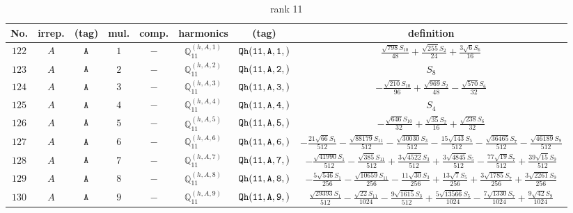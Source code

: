 \documentclass[fleqn,8pt]{jsarticle}
\begin{document}
\begin{table}[ht!]
\begin{center}
\caption{rank 11}
\renewcommand{\arraystretch}{1.3}
\begin{tabular}{cccccccc} \hline \hline
No. & irrep. & (tag) & mul. & comp. & harmonics & (tag) & definition \\ \hline
$ 122 $ & $ A $ & $ {\tt A} $ & $ 1 $ & $ - $ & $ \mathbb{Q}_{11}^{(h,A,1)} $ & $ {\tt Qh(11,A,1,)} $ & $ \frac{\sqrt{798} S_{10}}{48} + \frac{\sqrt{255} S_{2}}{24} + \frac{3 \sqrt{6} S_{6}}{16} $ \\
$ 123 $ & $ A $ & $ {\tt A} $ & $ 2 $ & $ - $ & $ \mathbb{Q}_{11}^{(h,A,2)} $ & $ {\tt Qh(11,A,2,)} $ & $ S_{8} $ \\
$ 124 $ & $ A $ & $ {\tt A} $ & $ 3 $ & $ - $ & $ \mathbb{Q}_{11}^{(h,A,3)} $ & $ {\tt Qh(11,A,3,)} $ & $ - \frac{\sqrt{210} S_{10}}{96} + \frac{\sqrt{969} S_{2}}{48} - \frac{\sqrt{570} S_{6}}{32} $ \\
$ 125 $ & $ A $ & $ {\tt A} $ & $ 4 $ & $ - $ & $ \mathbb{Q}_{11}^{(h,A,4)} $ & $ {\tt Qh(11,A,4,)} $ & $ S_{4} $ \\
$ 126 $ & $ A $ & $ {\tt A} $ & $ 5 $ & $ - $ & $ \mathbb{Q}_{11}^{(h,A,5)} $ & $ {\tt Qh(11,A,5,)} $ & $ - \frac{\sqrt{646} S_{10}}{32} + \frac{\sqrt{35} S_{2}}{16} + \frac{\sqrt{238} S_{6}}{32} $ \\
$ 127 $ & $ A $ & $ {\tt A} $ & $ 6 $ & $ - $ & $ \mathbb{Q}_{11}^{(h,A,6)} $ & $ {\tt Qh(11,A,6,)} $ & $ - \frac{21 \sqrt{66} S_{1}}{512} - \frac{\sqrt{88179} S_{11}}{512} - \frac{\sqrt{30030} S_{3}}{512} - \frac{15 \sqrt{143} S_{5}}{512} - \frac{\sqrt{36465} S_{7}}{512} - \frac{\sqrt{46189} S_{9}}{512} $ \\
$ 128 $ & $ A $ & $ {\tt A} $ & $ 7 $ & $ - $ & $ \mathbb{Q}_{11}^{(h,A,7)} $ & $ {\tt Qh(11,A,7,)} $ & $ - \frac{\sqrt{41990} S_{1}}{512} - \frac{\sqrt{385} S_{11}}{512} + \frac{3 \sqrt{4522} S_{3}}{512} + \frac{3 \sqrt{4845} S_{5}}{512} - \frac{77 \sqrt{19} S_{7}}{512} + \frac{39 \sqrt{15} S_{9}}{512} $ \\
$ 129 $ & $ A $ & $ {\tt A} $ & $ 8 $ & $ - $ & $ \mathbb{Q}_{11}^{(h,A,8)} $ & $ {\tt Qh(11,A,8,)} $ & $ - \frac{5 \sqrt{546} S_{1}}{256} - \frac{\sqrt{10659} S_{11}}{256} - \frac{11 \sqrt{30} S_{3}}{256} + \frac{13 \sqrt{7} S_{5}}{256} + \frac{3 \sqrt{1785} S_{7}}{256} + \frac{3 \sqrt{2261} S_{9}}{256} $ \\
$ 130 $ & $ A $ & $ {\tt A} $ & $ 9 $ & $ - $ & $ \mathbb{Q}_{11}^{(h,A,9)} $ & $ {\tt Qh(11,A,9,)} $ & $ \frac{\sqrt{29393} S_{1}}{512} - \frac{\sqrt{22} S_{11}}{1024} - \frac{9 \sqrt{1615} S_{3}}{512} + \frac{5 \sqrt{13566} S_{5}}{1024} - \frac{7 \sqrt{1330} S_{7}}{1024} + \frac{9 \sqrt{42} S_{9}}{1024} $ \\

\end{tabular}
\end{center}
\end{table}
\end{document}
